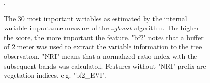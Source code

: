 \documentclass[review]{elsarticle}
\begin{document}
\begin{figure} [b!]
	\begin{center}
		\caption{The 30 most important variables as estimated by the internal variable importance measure of the \textit{xgboost} algorithm. The higher the score, the more important the feature.
			"bf2" notes that a buffer of 2 meter was used to extract the variable information to the tree observation. "NRI" means that a normalized ratio index with the subsequent bands was calculated. Features without "NRI" prefix are vegetation indices, e.g. "bf2\_EVI".}. %
		\label{fig:var-imp}
	\end{center}
\end{figure}
\end{document}
